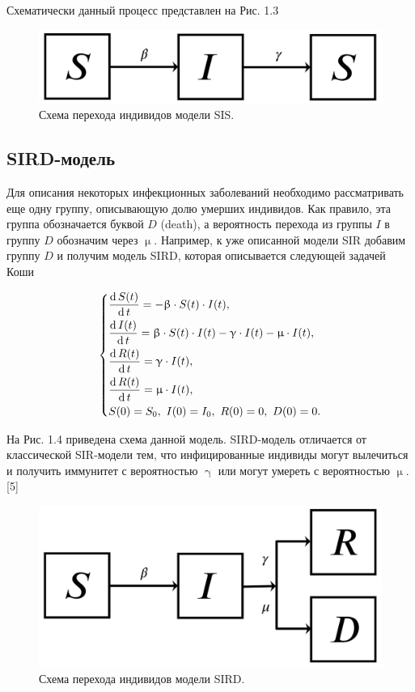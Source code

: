 \documentclass[a4paper, 14pt]{extreport}
\numberwithin{equation}{section}
\renewcommand{\beta}{\upbeta}
\renewcommand{\gamma}{\upgamma}
\renewcommand{\mu}{\upmu}
\renewcommand{\d}{\operatorname{d}}
\begin{document}
	Схематически данный процесс представлен на Рис. 1.3
	
	\begin{figure}[h]
		\centering
		\includegraphics[scale=0.25]{images/img02}
		\caption{Схема перехода индивидов модели SIS.}
		\label{fig:img02}
	\end{figure}
	
	\subsection{SIRD-модель}
	Для описания некоторых инфекционных заболеваний необходимо рассматривать еще одну группу, описывающую долю умерших индивидов. Как правило, эта группа обозначается буквой $D$ (death), а вероятность перехода из группы $I$ в группу $D$ обозначим через $\mu$. Например, к уже описанной модели SIR добавим группу $D$ и получим модель SIRD, которая описывается следующей задачей Коши
	
	\begin{equation}
		\begin{dcases}
			\dfrac {\d S(t)}{\d t} = -\beta \cdot S(t) \cdot I(t),\\
			\dfrac{\d I(t)}{\d t} = \beta \cdot S(t)\cdot I(t) - \gamma\cdot I(t) - \mu\cdot I(t),\\
			\dfrac{\d R(t)}{\d t} = \gamma\cdot I(t), \\
			\dfrac{\d R(t)}{\d t} = \mu\cdot I(t),\\
			S(0) = S_0,\ I(0) = I_0,\ R(0) = 0,\ D(0) = 0.
		\end{dcases}
	\end{equation}
	
	На Рис. 1.4
	приведена схема данной модель. SIRD-модель отличается от классической SIR-модели тем, что инфицированные индивиды могут вылечиться и получить иммунитет с вероятностью $\gamma$ или могут умереть с вероятностью $\mu$. [5]
	\begin{figure}[h]
		\centering
		\includegraphics[scale=0.25]{images/img03}
		\caption{Схема перехода индивидов модели SIRD.}
		\label{fig:img03}
	\end{figure}
	
\end{document}

